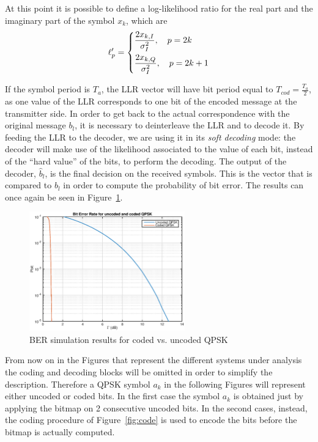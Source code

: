 \documentclass[10pt]{article}
\begin{document}
At this point it is possible to define a log-likelihood ratio for the real part and the imaginary part of the symbol $x_k$, which are
\begin{equation}
	\ell'_p =
	\begin{dcases}
	\frac{2 x_{k,I}}{\sigma_I^2}, \quad p = 2k \\
	\frac{2 x_{k,Q}}{\sigma_I^2}, \quad p = 2k +1
	\end{dcases}
\end{equation}


If the symbol period is $T_a$, the LLR vector will have bit period equal to $T_{cod} = \frac{T_a}{2}$, as one value of the LLR corresponds to one bit of the encoded message at the transmitter side. In order to get back to the actual correspondence with the original message $b_l$, it is necessary to deinterleave the LLR and to decode it. By feeding the LLR to the decoder, we are using it in its \emph{soft decoding} mode: the decoder will make use of the likelihood associated to the value of each bit, instead of the ``hard value'' of the bits, to perform the decoding. %
The output of the decoder, $\hat{b}_l$, is the final decision on the received symbols. This is the vector that is compared to $b_l$ in order to compute the probability of bit error. The results can once again be seen in Figure~\ref{fig:problem1_pbit}. 

\begin{figure}
	\centering
	\includegraphics[width = 0.6\textwidth]{problem1}
	\caption{BER simulation results for coded vs. uncoded QPSK}
	\label{fig:problem1_pbit}
\end{figure}

From now on in the Figures that represent the different systems under analysis the coding and decoding blocks will be omitted in order to simplify the description. Therefore a QPSK symbol $a_k$ in the following Figures will represent either uncoded or coded bits. In the first case the symbol $a_k$ is obtained just by applying the bitmap on 2 consecutive uncoded bits. In the second cases, instead, the coding procedure of Figure~\ref{fig:code} is used to encode the bits before the bitmap is actually computed.
\end{document}
